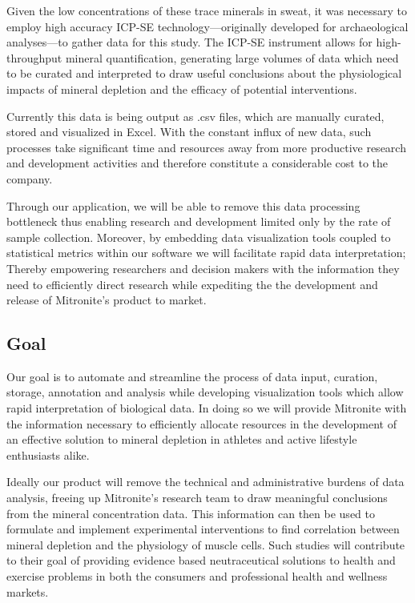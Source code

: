\documentclass[10pt,twocolumn,letterpaper]{article}
\begin{document}
            Given the low concentrations of these trace minerals in sweat, it was necessary to employ high accuracy ICP-SE technology---originally developed for archaeological analyses---to gather data for this study. The ICP-SE instrument allows for high-throughput mineral quantification, generating large volumes of data which need to be curated and interpreted to draw useful conclusions about the physiological impacts of mineral depletion and the efficacy of potential interventions. 
            
            Currently this data is being output as .csv files, which are manually curated, stored and visualized in Excel. With the constant influx of new data, such processes take significant time and resources away from more productive research and development activities and therefore constitute a considerable cost to the company. 
            
            Through our application, we will be able to remove this data processing bottleneck thus enabling research and development limited only by the rate of sample collection. Moreover, by embedding data visualization tools coupled to statistical metrics within our software we will facilitate rapid data interpretation; Thereby empowering researchers and decision makers with the information they need to efficiently direct research while expediting the the development and release of Mitronite's product to market.
            
            \subsection{Goal}
            
            Our goal is to automate and streamline the process of data input, curation, storage, annotation and analysis while developing visualization tools which allow rapid interpretation of biological data. In doing so we will provide Mitronite with the information necessary to efficiently allocate resources in the development of an effective solution to mineral depletion in athletes and active lifestyle enthusiasts alike. 
            
            Ideally our product will remove the technical and administrative burdens of data analysis, freeing up Mitronite's research team to draw meaningful conclusions from the mineral concentration data. This information can then be used to formulate and implement experimental interventions to find correlation between mineral depletion and the physiology of muscle cells. Such studies will contribute to their goal of providing evidence based neutraceutical solutions to health and exercise problems in both the consumers and professional health and wellness markets.
            
\end{document}
